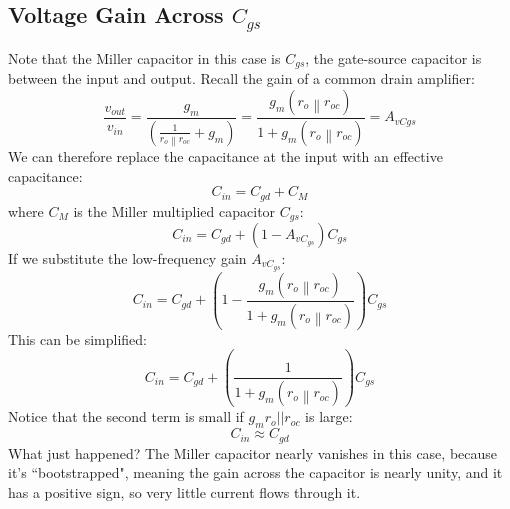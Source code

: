 \subsection{Voltage Gain Across $C_{gs}$}


Note that the Miller capacitor in this case is $C_{gs}$, the gate-source capacitor is between the input and output.  Recall the gain of a common drain amplifier:
\begin{equation}
	\frac{{{v_{out}}}}{{{v_{in}}}} = \frac{{{g_m}}}{{\left( {\frac{1}{{\left. {{r_o}} \right\|{r_{oc}}}} + {g_m}} \right)}} = \frac{{{g_m}(\left. {{r_o}} \right\|{r_{oc}})}}{{1 + {g_m}(\left. {{r_o}} \right\|{r_{oc}})}} = {A_{vCgs}}
\end{equation}
%
We can therefore replace the capacitance at the input with an effective capacitance:
%
\begin{equation} 
	{C_{in}} = {C_{gd}} + {C_M} 
\end{equation}
%
where $C_M$ is the Miller multiplied capacitor $C_{gs}$:
%
\begin{equation} 
	{C_{in}} = {C_{gd}} + (1 - {A_{v{C_{gs}}}}){C_{gs}} 
\end{equation}
%
If we substitute the low-frequency gain $A_{v{C_{gs}}}$:
%
\begin{equation} 
	{C_{in}} = {C_{gd}} + \left(1 - \frac{{{g_m}(\left. {{r_o}} \right\|{r_{oc}})}}{{1 + {g_m}(\left. {{r_o}} \right\|{r_{oc}})}} \right){C_{gs}}
\end{equation}
This can be simplified:
%
\begin{equation} 
	{C_{in}} = {C_{gd}} + \left(\frac{1}{{1 + {g_m}(\left. {{r_o}} \right\|{r_{oc}})}} \right){C_{gs}} 
\end{equation}
%
Notice that the second term is small if $g_m r_o || r_{oc}$ is large:
%
\begin{equation} 
	{C_{in}} \approx {C_{gd}} 
\end{equation}
%
What just happened?  The Miller capacitor nearly vanishes in this case, because it's ``bootstrapped", meaning the gain across the capacitor is nearly unity, and it has a positive sign, so very little current flows through it.



